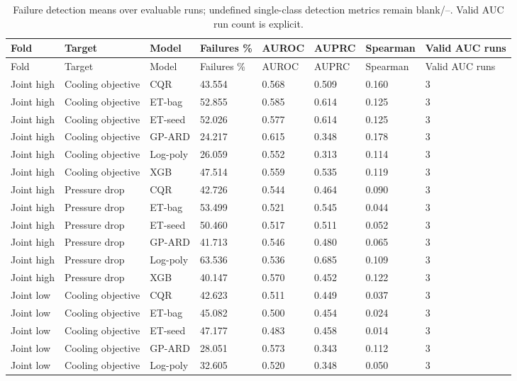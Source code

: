 \begingroup\small\setlength{\tabcolsep}{3pt}\begin{longtable}{llllllll}
\caption{Failure detection means over evaluable runs; undefined single-class detection metrics remain blank/--. Valid AUC run count is explicit.}\label{tab:ubend-detection}\\\toprule
Fold & Target & Model & Failures \% & AUROC & AUPRC & Spearman & Valid AUC runs\\\midrule
\endfirsthead\toprule
Fold & Target & Model & Failures \% & AUROC & AUPRC & Spearman & Valid AUC runs\\\midrule
\endhead
Joint high & Cooling objective & CQR & 43.554 & 0.568 & 0.509 & 0.160 & 3\\
Joint high & Cooling objective & ET-bag & 52.855 & 0.585 & 0.614 & 0.125 & 3\\
Joint high & Cooling objective & ET-seed & 52.026 & 0.577 & 0.614 & 0.125 & 3\\
Joint high & Cooling objective & GP-ARD & 24.217 & 0.615 & 0.348 & 0.178 & 3\\
Joint high & Cooling objective & Log-poly & 26.059 & 0.552 & 0.313 & 0.114 & 3\\
Joint high & Cooling objective & XGB & 47.514 & 0.559 & 0.535 & 0.119 & 3\\
Joint high & Pressure drop & CQR & 42.726 & 0.544 & 0.464 & 0.090 & 3\\
Joint high & Pressure drop & ET-bag & 53.499 & 0.521 & 0.545 & 0.044 & 3\\
Joint high & Pressure drop & ET-seed & 50.460 & 0.517 & 0.511 & 0.052 & 3\\
Joint high & Pressure drop & GP-ARD & 41.713 & 0.546 & 0.480 & 0.065 & 3\\
Joint high & Pressure drop & Log-poly & 63.536 & 0.536 & 0.685 & 0.109 & 3\\
Joint high & Pressure drop & XGB & 40.147 & 0.570 & 0.452 & 0.122 & 3\\
Joint low & Cooling objective & CQR & 42.623 & 0.511 & 0.449 & 0.037 & 3\\
Joint low & Cooling objective & ET-bag & 45.082 & 0.500 & 0.454 & 0.024 & 3\\
Joint low & Cooling objective & ET-seed & 47.177 & 0.483 & 0.458 & 0.014 & 3\\
Joint low & Cooling objective & GP-ARD & 28.051 & 0.573 & 0.343 & 0.112 & 3\\
Joint low & Cooling objective & Log-poly & 32.605 & 0.520 & 0.348 & 0.050 & 3\\

\end{longtable}
